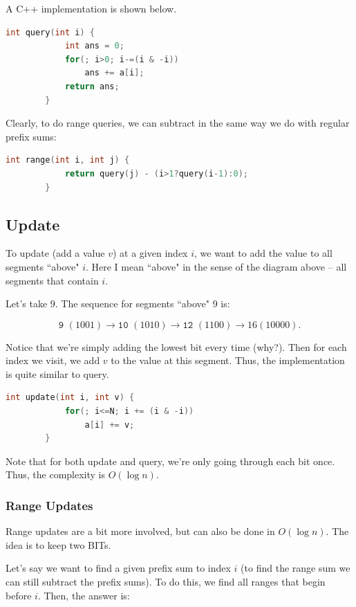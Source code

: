 \documentclass{article}
\begin{document}
        
        A C++ implementation is shown below.
        \begin{lstlisting}[language=C++]
        int query(int i) {
            int ans = 0;
            for(; i>0; i-=(i & -i))
                ans += a[i];
            return ans;
        }
        \end{lstlisting}
        
        Clearly, to do range queries, we can subtract in the same way we do with regular prefix sums:
        
        \begin{lstlisting}[language=C++]
        int range(int i, int j) {
            return query(j) - (i>1?query(i-1):0);
        }
        \end{lstlisting}
    \subsection{Update}
        To update (add a value $v$) at a given index $i$, we want to add the value to all segments ``above" $i$. Here I mean ``above" in the sense of the diagram above -- all segments that contain $i$.
        
        Let's take $9$. The sequence for segments ``above" 9 is:
        
            $$ \texttt{9 }(1001)\rightarrow \texttt{10 }(1010) \rightarrow \texttt{12 }(1100) \rightarrow{16} (10000). $$
            
        Notice that we're simply adding the lowest bit every time (why?). Then for each index we visit, we add $v$ to the value at this segment. Thus, the implementation is quite similar to query. 
        \begin{lstlisting}[language=C++]
        int update(int i, int v) {
            for(; i<=N; i += (i & -i))
                a[i] += v;
        }
        \end{lstlisting}
        
    Note that for both update and query, we're only going through each bit once. Thus, the complexity is $O(\log n)$.
    
        \subsubsection{Range Updates}
            Range updates are a bit more involved, but can also be done in $O(\log n)$. The idea is to keep two BITs.
            
            Let's say we want to find a given prefix sum to index $i$ (to find the range sum we can still subtract the prefix sums). To do this, we find all ranges that begin before $i$. Then, the answer is:
            
\end{document}
